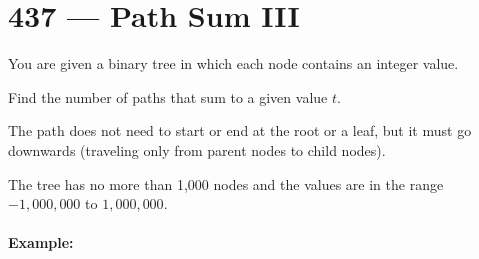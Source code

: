 \section{437 --- Path Sum III}
You are given a binary tree in which each node contains an integer value.

Find the number of paths that sum to a given value $t$.

The path does not need to start or end at the root or a leaf, but it must go downwards (traveling only from parent nodes to child nodes).

The tree has no more than 1,000 nodes and the values are in the range $-1,000,000$ to $1,000,000$.

\paragraph{Example:}
